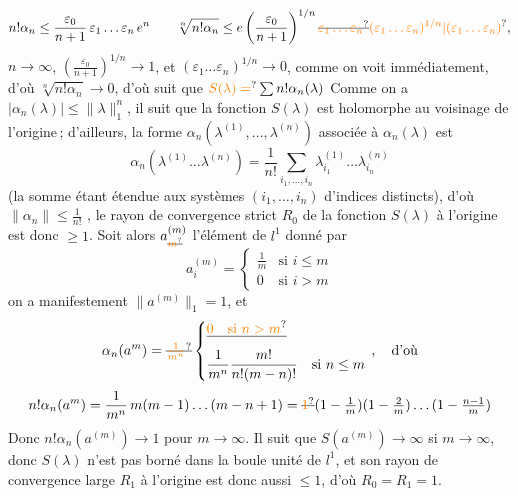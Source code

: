 \[
n!\alpha_n\leq\frac{\varepsilon_0}{n+1}\,\varepsilon_1\ldots\varepsilon_n\,e^n
\qquad \sqrt[n]{n!\alpha_n}\leq e\left(\frac{\varepsilon_0}{n+1}\right)^{1/n}
\deleted{\unsure{\varepsilon_1\ldots\varepsilon_n}}\unsure{(\varepsilon_1\ldots\varepsilon_n)^{1/n}|(\varepsilon_1\ldots\varepsilon_n)},
\]
\unsure{(} $n\to\infty$, $\left(\frac{\varepsilon_0}{n+1}\right)^{1/n}\to1$, et
$(\varepsilon_1\ldots\varepsilon_n)^{1/n}\to0$,
comme on voit immédiatement, d'où $\sqrt[n]{n!\alpha_n}\to0$,
d'où suit que $\unsure{S(\lambda)=}\sum n!\alpha_n(\lambda)$    
Comme on a $|\alpha_n(\lambda)|\leq\|\lambda\|_1^n$, il suit que
la fonction $S(\lambda)$  est holomorphe au voisinage
de l'origine\,; d'ailleurs, la forme 
$\alpha_n(\lambda^{(1)},\ldots,\lambda^{(n)})$ associée à $\alpha_n(\lambda)$ est
\[
\alpha_n(\lambda^{(1)}\ldots\lambda^{(n)})=\frac{1}{n!}
\sum_{i_1,\ldots,i_n}\lambda^{(1)}_{i_1}\ldots\lambda^{(n)}_{i_n}
\]
(la somme étant étendue aux systèmes $(i_1,\ldots,i_n)$ d'indices  distincts),
d'où $\|\alpha_n\|\leq\frac{1}{n!}$ ,
le rayon de convergence strict $R_0$ de la fonction $S(\lambda)$ à l'origine est
donc  $\geq1$. Soit alors $a_{\deleted{\unsure{m}}}^{(m)}$ l'élément de $l^1$
 donné par
\[
a_i^{(m)}=\begin{cases}\frac{1}{m}&\text{si }i\leq m\\0&\text{si }i>m\end{cases}
\]
on a manifestement $\|a^{(m)}\|_1=1$, et
\[
\alpha_n(a^m)=\deleted{\unsure{\frac{1}{m^n}}}
\left\{\begin{aligned}
&\deleted{\unsure{0\quad\text{si }n>m}}\\
&\frac{1}{m^n}\frac{m!}{n!(m-n)!}\quad\text{si }n\leq m
\end{aligned}\right.\,,\quad\text{d'où}
\]
\[
n!\alpha_n(a^m)=\frac{1}{m^n}\,m(m-1)\ldots(m-n+1)=
\deleted{\unsure{1}}(1-\tfrac{1}{m})(1-\tfrac{2}{m})\ldots(1-\tfrac{n-1}{m})
\]
Donc $n!\alpha_n(a^{(m)})\to1$ pour $m\to\infty$.
Il suit que $S(a^{(m)})\to\infty$ si $m\to\infty$,
donc $S(\lambda)$ n'est pas borné dans la boule
unité de $l^1$, et son rayon de convergence
large $R_1$ à l'origine est donc aussi $\leq1$, d'où $R_0=R_1=1$.

